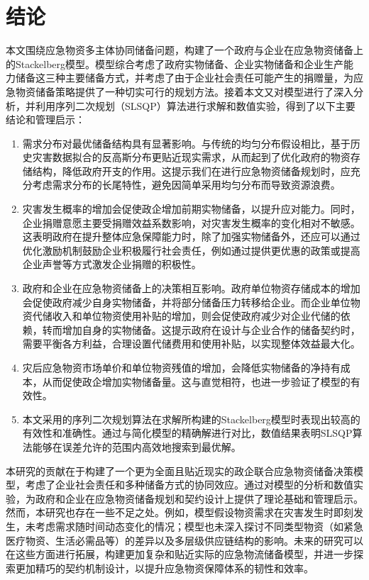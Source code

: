 \documentclass[a4paper,8pt,twocolumn]{article} %
\begin{document}
\section{结论}
本文围绕应急物资多主体协同储备问题，构建了一个政府与企业在应急物资储备上的Stackelberg模型。模型综合考虑了政府实物储备、企业实物储备和企业生产能力储备这三种主要储备方式，并考虑了由于企业社会责任可能产生的捐赠量，为应急物资储备策略提供了一种切实可行的规划方法。接着本文又对模型进行了深入分析，并利用序列二次规划（SLSQP）算法进行求解和数值实验，得到了以下主要结论和管理启示：
\begin{enumerate}
    \item 需求分布对最优储备结构具有显著影响。与传统的均匀分布假设相比，基于历史灾害数据拟合的反高斯分布更贴近现实需求，从而起到了优化政府的物资存储结构，降低政府开支的作用。这提示我们在进行应急物资储备规划时，应充分考虑需求分布的长尾特性，避免因简单采用均匀分布而导致资源浪费。
    \item 灾害发生概率的增加会促使政企增加前期实物储备，以提升应对能力。同时，企业捐赠意愿主要受捐赠效益系数影响，对灾害发生概率的变化相对不敏感。这表明政府在提升整体应急保障能力时，除了加强实物储备外，还应可以通过优化激励机制鼓励企业积极履行社会责任，例如通过提供更优惠的政策或提高企业声誉等方式激发企业捐赠的积极性。
    \item 政府和企业在应急物资储备上的决策相互影响。政府单位物资存储成本的增加会促使政府减少自身实物储备，并将部分储备压力转移给企业。而企业单位物资代储收入和单位物资使用补贴的增加，则会促使政府减少对企业代储的依赖，转而增加自身的实物储备。这提示政府在设计与企业合作的储备契约时，需要平衡各方利益，合理设置代储费用和使用补贴，以实现整体效益最大化。
    \item 灾后应急物资市场单价和单位物资残值的增加，会降低实物储备的净持有成本，从而促使政企增加实物储备量。这与直觉相符，也进一步验证了模型的有效性。
    \item 本文采用的序列二次规划算法在求解所构建的Stackelberg模型时表现出较高的有效性和准确性。通过与简化模型的精确解进行对比，数值结果表明SLSQP算法能够在误差允许的范围内高效地搜索到最优解。
\end{enumerate}

本研究的贡献在于构建了一个更为全面且贴近现实的政企联合应急物资储备决策模型，考虑了企业社会责任和多种储备方式的协同效应。通过对模型的分析和数值实验，为政府和企业在应急物资储备规划和契约设计上提供了理论基础和管理启示。
然而，本研究也存在一些不足之处。例如，模型假设物资需求在灾害发生时即刻发生，未考虑需求随时间动态变化的情况；模型也未深入探讨不同类型物资（如紧急医疗物资、生活必需品等）的差异以及多层级供应链结构的影响。未来的研究可以在这些方面进行拓展，构建更加复杂和贴近实际的应急物流储备模型，并进一步探索更加精巧的契约机制设计，以提升应急物资保障体系的韧性和效率。


\renewcommand*{\bibfont}{\footnotesize}

\printbibliography
\end{document}
